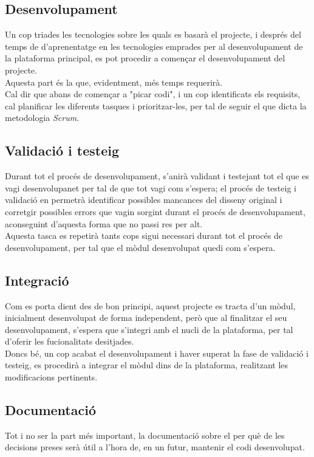\subsection{Desenvolupament}
Un cop triades les tecnologies sobre les quals es basarà el projecte, i després del temps de d'aprenentatge en les tecnologies emprades per al desenvolupament de la plataforma principal, es pot procedir a començar el desenvolupament del projecte.\\
\newline Aquesta part és la que, evidentment, més temps requerirà.\\
Cal dir que abans de començar a "picar codi", i un cop identificats els requisits, cal planificar les diferents tasques i prioritzar-les, per tal de seguir el que dicta la metodologia \textit{Scrum}\cite{scrum}.

\subsection{Validació i testeig}
Durant tot el procés de desenvolupament, s'anirà validant i testejant tot el que es vagi desenvolupanet per tal de que tot vagi com s'espera; el procés de testeig i validació en permetrà identificar possibles mancances del disseny original i corretgir possibles errors que vagin sorgint durant el procés de desenvolupament, aconseguint d'aquesta forma que no passi res per alt.\\
\newline Aquesta tasca es  repetirà tants cops sigui necessari durant tot el procés de desenvolupament, per tal que el mòdul desenvolupat quedi com s'espera.

\subsection{Integració}
Com es porta dient des de bon principi, aquest projecte es tracta d'un mòdul, inicialment desenvolupat de forma independent, però que al finalitzar el seu desenvolupament, s'espera que s'integri amb el nucli de la plataforma, per tal d'oferir les fucionalitats desitjades.\\
\newline Doncs bé, un cop acabat el desenvolupament i haver superat la fase de validació i testeig, es procedirà a integrar el mòdul dins de la plataforma, realitzant les modificacions pertinents.

\subsection{Documentació}
Tot i no ser la part més important, la documentació sobre el per què de les decisions preses serà útil a l'hora de, en un futur, mantenir el codi desenvolupat.



